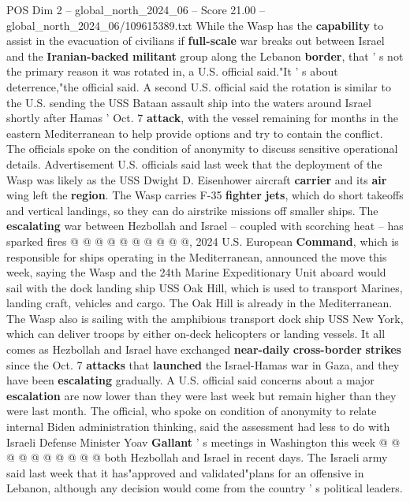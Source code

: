 \begin{textsample}{POS Dim 2 – global\_north\_2024\_06 – Score 21.00 – global\_north\_2024\_06/109615389.txt}  \label{ex:f2_pos_315}
While the Wasp has the \textbf{capability} to assist in the evacuation of civilians if \textbf{full-scale} war breaks out between Israel and the \textbf{Iranian-backed} \textbf{militant} group along the Lebanon \textbf{border}, that ' s not the primary reason it was rotated in, a U.S. official said."It ' s about deterrence,"the official said.
A second U.S. official said the rotation is similar to the U.S. sending the USS Bataan assault ship into the waters around Israel shortly after Hamas ' Oct. 7 \textbf{attack}, with the vessel remaining for months in the eastern Mediterranean to help provide options and try to contain the conflict.
The officials spoke on the condition of anonymity to discuss sensitive operational details.
Advertisement U.S. officials said last week that the deployment of the Wasp was likely as the USS Dwight D.
Eisenhower aircraft \textbf{carrier} and its \textbf{air} wing left the \textbf{region}.
The Wasp carries F-35 \textbf{fighter} \textbf{jets}, which do short takeoffs and vertical landings, so they can do airstrike missions off smaller ships.
The \textbf{escalating} war between Hezbollah and Israel -- coupled with scorching heat -- has sparked fires @ @ @ @ @ @ @ @ @ @, 2024 U.S.
European \textbf{Command}, which is responsible for ships operating in the Mediterranean, announced the move this week, saying the Wasp and the 24th Marine Expeditionary Unit aboard would sail with the dock landing ship USS Oak Hill, which is used to transport Marines, landing craft, vehicles and cargo.
The Oak Hill is already in the Mediterranean.
The Wasp also is sailing with the amphibious transport dock ship USS New York, which can deliver troops by either on-deck helicopters or landing vessels.
It all comes as Hezbollah and Israel have exchanged \textbf{near-daily} \textbf{cross-border} \textbf{strikes} since the Oct. 7 \textbf{attacks} that \textbf{launched} the Israel-Hamas war in Gaza, and they have been \textbf{escalating} gradually.
A U.S. official said concerns about a major \textbf{escalation} are now lower than they were last week but remain higher than they were last month.
The official, who spoke on condition of anonymity to relate internal Biden administration thinking, said the assessment had less to do with Israeli Defense Minister Yoav \textbf{Gallant} ' s meetings in Washington this week @ @ @ @ @ @ @ @ @ @ both Hezbollah and Israel in recent days.
The Israeli army said last week that it has"approved and validated"plans for an offensive in Lebanon, although any decision would come from the country ' s political leaders.

\end{textsample}
